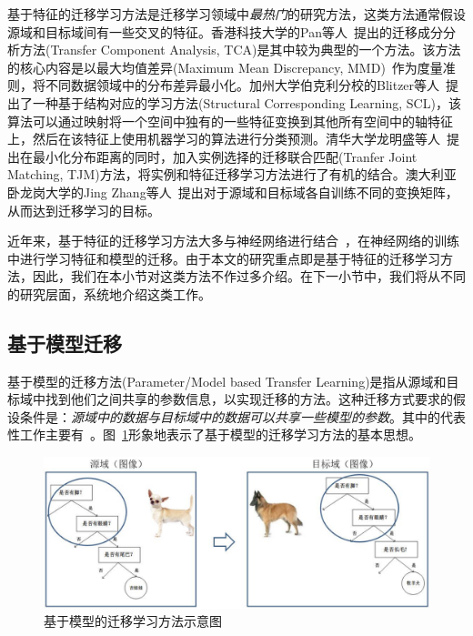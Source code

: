 基于特征的迁移学习方法是迁移学习领域中\textit{最热门}的研究方法，这类方法通常假设源域和目标域间有一些交叉的特征。香港科技大学的Pan等人~\cite{pan2011domain}提出的迁移成分分析方法(Transfer Component Analysis, TCA)是其中较为典型的一个方法。该方法的核心内容是以最大均值差异(Maximum Mean Discrepancy, MMD)~\cite{borgwardt2006integrating}作为度量准则，将不同数据领域中的分布差异最小化。加州大学伯克利分校的Blitzer等人~\cite{blitzer2006domain}提出了一种基于结构对应的学习方法(Structural Corresponding Learning, SCL)，该算法可以通过映射将一个空间中独有的一些特征变换到其他所有空间中的轴特征上，然后在该特征上使用机器学习的算法进行分类预测。清华大学龙明盛等人~\cite{long2014transfer}提出在最小化分布距离的同时，加入实例选择的迁移联合匹配(Tranfer Joint Matching, TJM)方法，将实例和特征迁移学习方法进行了有机的结合。澳大利亚卧龙岗大学的Jing Zhang等人~\cite{zhang2017joint}提出对于源域和目标域各自训练不同的变换矩阵，从而达到迁移学习的目标。

近年来，基于特征的迁移学习方法大多与神经网络进行结合~\cite{long2015learning,long2016deep,long2017deep,sener2016learning}，在神经网络的训练中进行学习特征和模型的迁移。由于本文的研究重点即是基于特征的迁移学习方法，因此，我们在本小节对这类方法不作过多介绍。在下一小节中，我们将从不同的研究层面，系统地介绍这类工作。

\subsection{基于模型迁移}

基于模型的迁移方法(Parameter/Model based Transfer Learning)是指从源域和目标域中找到他们之间共享的参数信息，以实现迁移的方法。这种迁移方式要求的假设条件是：\textit{源域中的数据与目标域中的数据可以共享一些模型的参数}。其中的代表性工作主要有~\cite{zhao2010cross,zhao2011cross,pan2008transferring,pan2008transfer}。图~\ref{fig-method-model}形象地表示了基于模型的迁移学习方法的基本思想。

\begin{figure}[htbp]
	\centering
	\includegraphics[scale=0.4]{./figures/fig-method-model.pdf}
	\caption{基于模型的迁移学习方法示意图}
	\label{fig-method-model}
\end{figure}

